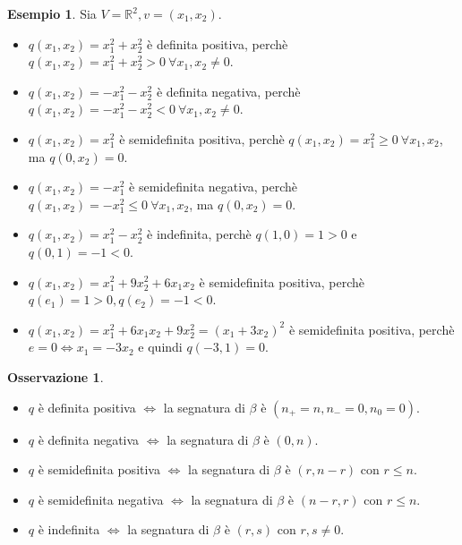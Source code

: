 \documentclass[a4paper]{article}
\theoremstyle{definition}
\newtheorem*{oss}{Osservazione}
\newtheorem*{es}{Esempio}
\begin{document}
	\begin{es}
		Sia $V = \mathbb{R}^2, v = (x_1, x_2)$.
		\begin{itemize}
			\item $q(x_1, x_2) = x_1^2 + x_2^2$ è definita positiva, perchè $q(x_1, x_2) = x_1^2 + x_2^2 > 0 \ \forall x_1, x_2 \ne 0$.
			\item $q(x_1, x_2) = -x_1^2 - x_2^2$ è definita negativa, perchè $q(x_1, x_2) = -x_1^2 - x_2^2 < 0 \ \forall x_1, x_2 \ne 0$.
			\item $q(x_1, x_2) = x_1^2$ è semidefinita positiva, perchè $q(x_1, x_2) = x_1^2 \ge 0 \ \forall x_1, x_2$, ma $q(0, x_2) = 0$.
			\item $q(x_1, x_2) = -x_1^2$ è semidefinita negativa, perchè $q(x_1, x_2) = -x_1^2 \le 0 \ \forall x_1, x_2$, ma $q(0, x_2) = 0$.
			\item $q(x_1, x_2) = x_1^2 - x_2^2$ è indefinita, perchè $q(1, 0) = 1 > 0$ e $q(0, 1) = -1 < 0$.
			\item $q(x_1, x_2) = x_1^2 + 9x_2^2 + 6x_1x_2$ è semidefinita positiva, perchè $q(e_1) = 1 > 0, q(e_2) = -1 < 0$.
			\item $q(x_1, x_2) = x_1^2 + 6x_1x_2 + 9x_2^2 = (x_1 + 3x_2)^2$ è semidefinita positiva, perchè $e = 0 \Leftrightarrow x_1 = -3x_2$ e quindi $q(-3, 1) = 0$.
		\end{itemize}
	\end{es}

	\begin{oss}
		\begin{itemize}
			\item $q$ è definita positiva $\Leftrightarrow$ la segnatura di $\beta$ è $(n_+ = n, n_- = 0, n_0 = 0)$.
			\item $q$ è definita negativa $\Leftrightarrow$ la segnatura di $\beta$ è $(0, n)$.
			\item $q$ è semidefinita positiva $\Leftrightarrow$ la segnatura di $\beta$ è $(r, n - r)$ con $r \le n$.
			\item $q$ è semidefinita negativa $\Leftrightarrow$ la segnatura di $\beta$ è $(n - r, r)$ con $r \le n$.
			\item $q$ è indefinita $\Leftrightarrow$ la segnatura di $\beta$ è $(r, s)$ con $r, s \ne 0$.
		\end{itemize}
	\end{oss}
\end{document}
